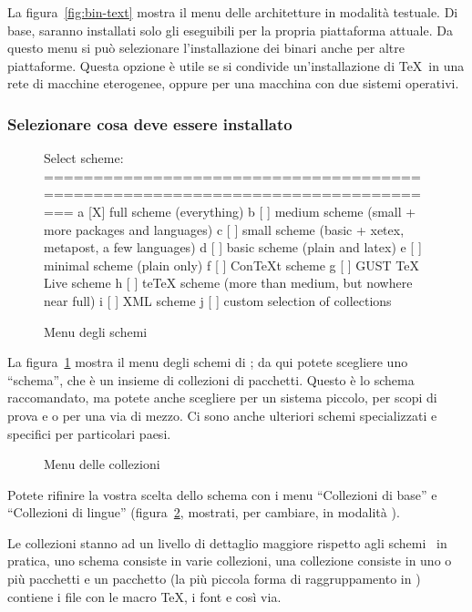 \documentclass{article}
\begin{document}
La figura~\ref{fig:bin-text} mostra il menu delle architetture in modalità
testuale. Di base, saranno installati solo gli eseguibili per la propria
piattaforma attuale. Da questo menu si può selezionare l'installazione
dei binari anche per altre piattaforme. Questa opzione è utile se si
condivide un'installazione di \TeX\ in una rete di macchine eterogenee,
oppure per una macchina con due sistemi operativi.

\subsubsection{Selezionare cosa deve essere installato}
\label{sec:components}

\begin{figure}[tbh]
\begin{boxedverbatim}
Select scheme:
===============================================================================
 a [X] full scheme (everything)
 b [ ] medium scheme (small + more packages and languages)
 c [ ] small scheme (basic + xetex, metapost, a few languages)
 d [ ] basic scheme (plain and latex)
 e [ ] minimal scheme (plain only)
 f [ ] ConTeXt scheme
 g [ ] GUST TeX Live scheme
 h [ ] teTeX scheme (more than medium, but nowhere near full)
 i [ ] XML scheme
 j [ ] custom selection of collections
\end{boxedverbatim}
\caption{Menu degli schemi}\label{fig:scheme-text}
\end{figure}

La figura~\ref{fig:scheme-text} mostra il menu degli schemi di \TL; da qui
potete scegliere uno ``schema'', che è un insieme di collezioni di pacchetti.
Questo è lo schema raccomandato, ma potete anche scegliere 
per un sistema piccolo,  per scopi di prova e
 o  per una via di mezzo. Ci sono anche
ulteriori schemi specializzati e specifici per particolari paesi.

\begin{figure}[tbh]
\caption{Menu delle collezioni}\label{fig:collections-gui}
\end{figure}

Potete rifinire la vostra scelta dello schema con i menu ``Collezioni di
base'' e ``Collezioni di lingue'' (figura~\ref{fig:collections-gui},
mostrati, per cambiare, in modalità \GUI).

Le collezioni stanno ad un livello di dettaglio maggiore rispetto agli
schemi \Dash\ in pratica, uno schema consiste in varie collezioni, una
collezione consiste in uno o più pacchetti e un pacchetto (la più piccola
forma di raggruppamento in \TL) contiene i file con le macro \TeX, i font
e così via.
\end{document}
